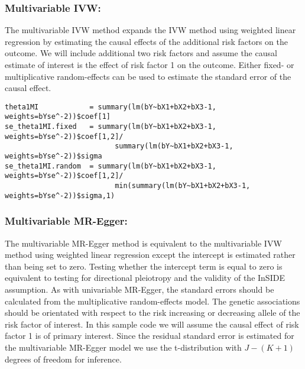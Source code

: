 \documentclass[a4paper,12pt]{article}
\begin{document}
\subsubsection*{Multivariable IVW:}
\normalsize{The multivariable IVW method expands the IVW method using weighted linear regression by estimating the causal effects of the additional risk factors on the outcome.  We will include additional two risk factors and assume the causal estimate of interest is the effect of risk factor 1 on the outcome. Either fixed- or multiplicative random-effects can be used to estimate the standard error of the causal effect.

\scriptsize{
\begin{verbatim}
theta1MI            = summary(lm(bY~bX1+bX2+bX3-1, weights=bYse^-2))$coef[1]
se_theta1MI.fixed   = summary(lm(bY~bX1+bX2+bX3-1, weights=bYse^-2))$coef[1,2]/
                          summary(lm(bY~bX1+bX2+bX3-1, weights=bYse^-2))$sigma
se_theta1MI.random  = summary(lm(bY~bX1+bX2+bX3-1, weights=bYse^-2))$coef[1,2]/
                          min(summary(lm(bY~bX1+bX2+bX3-1, weights=bYse^-2))$sigma,1)
\end{verbatim}
}

\subsubsection*{Multivariable MR-Egger:}
\normalsize{The multivariable MR-Egger method is equivalent to the multivariable IVW method using weighted linear regression except the intercept is estimated rather than being set to zero. Testing whether the intercept term is equal to zero is equivalent to testing for directional pleiotropy and the validity of the InSIDE assumption. As with univariable MR-Egger, the standard errors should be calculated from the multiplicative random-effects model. The genetic associations should be orientated with respect to the risk increasing or decreasing allele of the risk factor of interest. In this sample code we will assume the causal effect of risk factor 1 is of primary interest. Since the residual standard error is estimated for the multivariable MR-Egger model we use the t-distribution with $J-(K+1)$ degrees of freedom for inference. }

}
\end{document}
